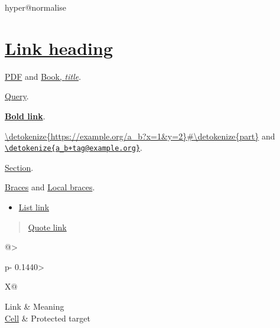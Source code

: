 \ifcsname hyper@normalise\endcsname\else\PackageError{mark2tex}{Markdown links require hyperref}{Load \string\usepackage{hyperref} in the document preamble.}\fi
\section{\href{\detokenize{https://example.org/heading}}{Link heading}}

\href{\detokenize{unterlagen/Auswahl der Inhalte.pdf}}{PDF} and \href{\detokenize{books/Book_name.pdf}}{Book, \emph{title}}.

\href{\detokenize{https://example.org/a}\%\detokenize{20b}\%\detokenize{20c?x=1&y=$@_}\#\detokenize{frag}}{Query}.

\textbf{\href{\detokenize{https://example.org/bold}\%\detokenize{20text?a=1&b=2}\#\detokenize{part}}{Bold link}}.

\url{\detokenize{https://example.org/a_b?x=1&y=2}\#\detokenize{part}} and \href{\detokenize{mailto:a_b+tag@example.org}}{\nolinkurl{\detokenize{a_b+tag@example.org}}}.

\hyperref[\detokenize{grundlagen}]{Section}.

\href{\detokenize{https://example.org/a}\Uchar123 \detokenize{b}\Uchar125 \Uchar94 \Uchar94 \detokenize{c}\Uchar92 \detokenize{d}}{Braces} and \href{\detokenize{unterlagen/a}\Uchar123 \detokenize{b}\Uchar125 \detokenize{.pdf}}{Local braces}.

\begin{itemize}
\item \href{\detokenize{https://example.org/list}}{List link}
\end{itemize}

\begin{quote}
\href{\detokenize{https://example.org/quote}}{Quote link}
\end{quote}

\par\addvspace{\medskipamount}
\noindent\begin{tabularx}{\linewidth}{@{}>{\raggedright\arraybackslash}p{}>{\raggedright\arraybackslash}X@{}}
\toprule
Link & Meaning \\
\midrule
\href{\detokenize{https://example.org/$@_}}{Cell} & Protected target \\
\bottomrule
\end{tabularx}
\par\addvspace{\medskipamount}


